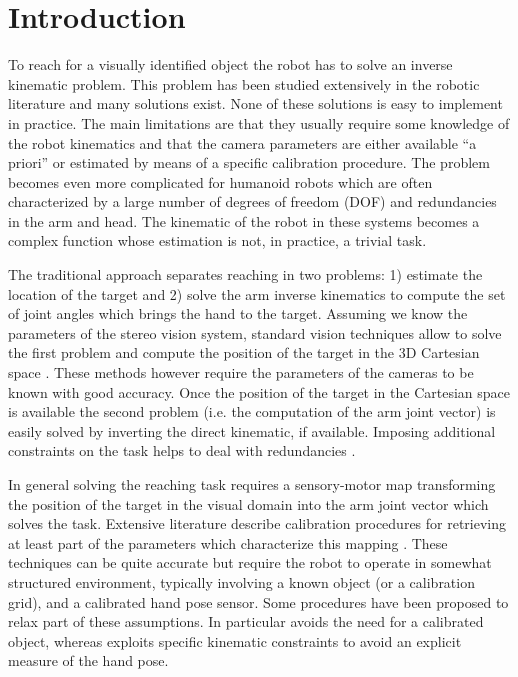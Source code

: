 \section{Introduction}
To reach for a visually identified object the robot has to solve
an inverse kinematic problem. This problem has been studied 
extensively in the robotic literature 
and many solutions exist. None of these solutions is easy to 
implement in practice. The main limitations are that they usually require 
some knowledge of the robot kinematics and that the camera parameters 
are either available ``a priori'' or estimated by means of a specific
calibration procedure. The problem becomes even more complicated 
for humanoid robots which are often characterized by 
a large number of degrees of freedom (DOF) and redundancies in the 
arm and head. The kinematic of the robot in these systems becomes a 
complex function whose estimation is not, in practice, a trivial task.

The traditional approach separates reaching in two
problems: 1) estimate the location of the target and
2) solve the arm inverse kinematics to compute the set of joint
angles which brings the hand to the target. Assuming we know the 
parameters of the stereo vision system, standard vision techniques
allow to solve the first problem and compute the position of the 
target in the 3D Cartesian space \cite{Soatto03vision}. These methods 
however require the parameters of the cameras to be known with 
good accuracy. Once the 
position of the target in the Cartesian space is available 
the second problem (i.e. the computation of the arm joint vector) is 
easily solved by inverting the direct kinematic, if available. 
Imposing additional constraints on the task helps to deal with 
redundancies \cite{liegeois77automatic}.

In general solving the reaching task requires a sensory-motor map
transforming the position of the target in the visual domain into the 
arm joint vector which solves the task. Extensive literature describe 
calibration procedures for retrieving at least part of the parameters 
which characterize this mapping 
\cite{Hollerbach96calibration,Tsai88Calibration}. 
These techniques can be quite accurate but require the robot to operate
in somewhat structured environment, typically involving a known object (or
a calibration grid), and a calibrated hand pose sensor. Some procedures 
have been proposed to relax part of these assumptions. In particular 
\cite{AHE01} avoids the need for a calibrated object, whereas 
\cite{Bennett91calibration} exploits specific kinematic constraints 
to avoid an explicit measure of the hand pose.

